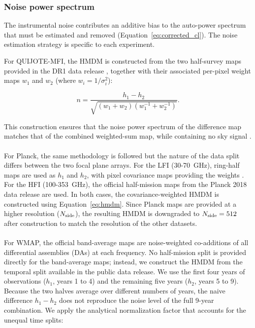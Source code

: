\subsubsection{Noise power spectrum}
\label{sec:noise_correction}

The instrumental noise contributes an additive bias to the auto-power spectrum that must be estimated and removed (Equation~\ref{eq:corrected_cl}). The noise estimation strategy is specific to each experiment.

For QUIJOTE-MFI, the HMDM is constructed from the two half-survey maps provided in the DR1 data release \citep{QUIJOTE_IV}, together with their associated per-pixel weight maps $w_1$ and $w_2$ (where $w_i = 1/\sigma_i^2$):

\begin{equation}
    \label{eq:hmdm}
    n = \frac{h_1 - h_2}{\sqrt{(w_1 + w_2)(w_1^{-1} + w_2^{-1})}}.
\end{equation}

This construction ensures that the noise power spectrum of the difference map matches that of the combined weighted-sum map, while containing no sky signal \citep{Planck_2015II}.

\paragraph{}

For Planck, the same methodology is followed but the nature of the data split differs between the two focal plane arrays. For the LFI (30-70~GHz), ring-half maps are used as $h_1$ and $h_2$, with pixel covariance maps providing the weights \citep{Planck_2015II}. For the HFI (100-353~GHz), the official half-mission maps from the Planck 2018 data release \citep{Planck_2018III} are used. In both cases, the covariance-weighted HMDM is constructed using Equation~\ref{eq:hmdm}. Since Planck maps are provided at a higher resolution ($N_{\rm side}$), the resulting HMDM is downgraded to $N_{\rm side} = 512$ after construction to match the resolution of the other datasets. 

\paragraph{}

For WMAP, the official band-average maps are noise-weighted co-additions of all differential assemblies (DAs) at each frequency. No half-mission split is provided directly for the band-average maps; instead, we construct the HMDM from the temporal split available in the public data release. We use the first four years of observations ($h_1$, years 1 to 4) and the remaining five years ($h_2$, years 5 to 9). Because the two halves average over different numbers of years, the naive difference $h_1 - h_2$ does not reproduce the noise level of the full 9-year combination. We apply the analytical normalization factor that accounts for the unequal time splits:

